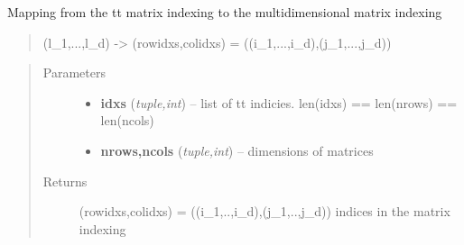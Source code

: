 \documentclass[a4paper,10pt,english]{sphinxmanual}
\begin{document}

\begin{fulllineitems}
\label{api-core:TensorToolbox.core.tt_to_mat_idxs}
Mapping from the tt matrix indexing to the multidimensional matrix indexing
\begin{quote}

(l\_1,...,l\_d) -\textgreater{} (rowidxs,colidxs) = ((i\_1,...,i\_d),(j\_1,...,j\_d))
\end{quote}
\begin{quote}\begin{description}
\item[{Parameters}] \leavevmode\begin{itemize}
\item {} 
\textbf{idxs} (\emph{tuple,int}) -- list of tt indicies. len(idxs) == len(nrows) == len(ncols)

\item {} 
\textbf{nrows,ncols} (\emph{tuple,int}) -- dimensions of matrices

\end{itemize}

\item[{Returns}] \leavevmode
(rowidxs,colidxs) = ((i\_1,..,i\_d),(j\_1,..,j\_d)) indices in the matrix indexing

\end{description}\end{quote}

\end{fulllineitems}

\end{document}
